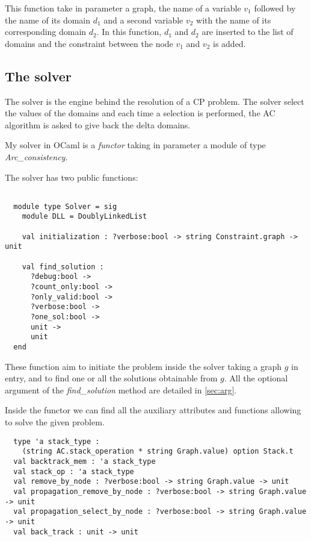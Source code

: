 \documentclass{rapport}
\begin{document}
This function take in parameter a graph, the name of a variable $v_1$ followed by the name of its domain $d_1$ and a second variable $v_2$ with the name of its corresponding domain $d_2$. In this function, $d_1$ and $d_2$ are inserted to the list of domains and the constraint between the node $v_1$ and $v_2$ is added.

\subsection{The solver}

The solver is the engine behind the resolution of a CP problem. The solver select the values of the domains and each time a selection is performed, the AC algorithm is asked to give back the delta domains.

My solver in OCaml is a \textit{functor} taking in parameter a module of type \textit{Arc\_consistency}.

The solver has two public functions:
\begin{verbatim}

  module type Solver = sig
    module DLL = DoublyLinkedList

    val initialization : ?verbose:bool -> string Constraint.graph -> unit

    val find_solution :
      ?debug:bool ->
      ?count_only:bool ->
      ?only_valid:bool ->
      ?verbose:bool ->
      ?one_sol:bool ->
      unit ->
      unit
  end

\end{verbatim}

These function aim to initiate the problem inside the solver taking a graph $g$ in entry, and to find one or all the solutions obtainable from $g$. All the optional argument of the \textit{find\_solution} method are detailed in \cref{sec:arg}.

Inside the functor we can find all the auxiliary attributes and functions allowing to solve the given problem.

\begin{verbatim}
  type 'a stack_type :
    (string AC.stack_operation * string Graph.value) option Stack.t
  val backtrack_mem : 'a stack_type 
  val stack_op : 'a stack_type
  val remove_by_node : ?verbose:bool -> string Graph.value -> unit
  val propagation_remove_by_node : ?verbose:bool -> string Graph.value -> unit
  val propagation_select_by_node : ?verbose:bool -> string Graph.value -> unit
  val back_track : unit -> unit
\end{verbatim}
\end{document}
